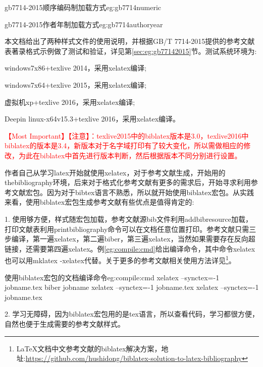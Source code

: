 \begin{codetex}{gb7714-2015顺序编码制加载方式}{eg:gb7714numeric}
\usepackage[backend=biber,style=gb7714-2015]{biblatex}
\end{codetex}

\begin{codetex}{gb7714-2015作者年制加载方式}{eg:gb7714authoryear}
\usepackage[backend=biber,style=gb7714-2015ay]{biblatex}
\end{codetex}

本文档给出了两种样式文件的使用说明，并根据GB/T 7714-2015提供的参考文献表著录格式示例做了测试和验证，详见第\ref{sec:eg:gb77142015}节。测试系统环境为:

windows7x86+texlive 2014，采用xelatex编译;

windows7x64+texlive 2015，采用xelatex编译;

虚拟机xp+texlive 2016，采用xelatex编译;

Deepin linux-x64v15.3+texlive 2016，采用xelatex编译。

\textcolor{red}{\HandRight \heiti 【Most Important】【注意】：texlive2015中的biblatex版本是3.0，texlive2016中biblatex的版本是3.4，新版本对于名字域打印有了较大变化，所以需做相应的修改，为此在biblatex中首先进行版本判断，然后根据版本不同分别进行设置。}

作者自己从学习latex开始就使用xelatex，对于参考文献生成，开始用的thebibliography环境，后来对于格式化参考文献有更多的需求后，开始寻求利用参考文献宏包。因为对于bibtex语言不熟悉，所以就开始使用biblatex宏包。从实践来看，使用biblatex宏包生成参考文献有些优点是值得肯定的:

1. 使用够方便，样式随宏包加载，参考文献源bib文件利用addbibresource加载，打印文献表利用printbibliography命令可以在文档任意位置打印。参考文献只需三步编译，第一遍xelatex，第二遍biber，第三遍xelatex，当然如果需要存在反向超链接，还需要第四遍xelatex。例\ref{eg:compile:cmd}给出编译命令，其中命令xelatex也可以用mklatex -xelatex代替。关于更多的参考文献相关使用方法详见\footnote{\LaTeX 文档中文参考文献的biblatex解决方案，地址:\url{https://github.com/hushidong/biblatex-solution-to-latex-bibliography}}。

\begin{codetex}{使用biblatex宏包的文档编译命令}{eg:compile:cmd}
xelatex --synctex=-1 jobname.tex
biber jobname
xelatex --synctex=-1 jobname.tex
xelatex --synctex=-1 jobname.tex
\end{codetex}

2. 学习无障碍，因为biblatex宏包用的是tex语言，所以查看代码，学习都很方便，自然也便于生成需要的参考文献样式。

